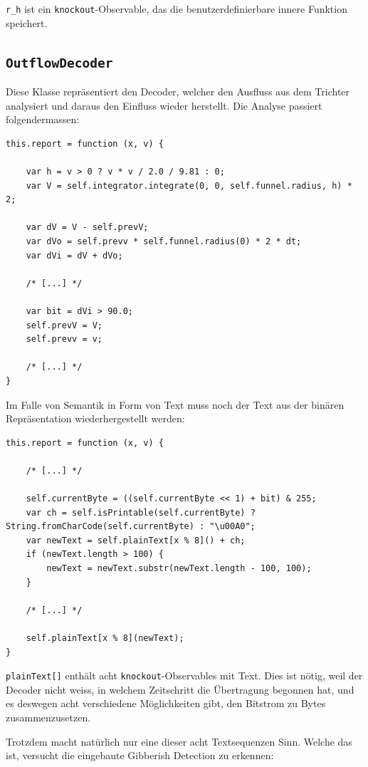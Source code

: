 \documentclass[11pt]{scrreprt} %
\theoremstyle{definition}
\begin{document}
{\tt r\_h} ist ein {\tt knockout}-Observable, das die benutzerdefinierbare innere Funktion speichert.

\subsection{{\tt OutflowDecoder}}

Diese Klasse repräsentiert den Decoder, welcher den Ausfluss aus dem Trichter analysiert und daraus den Einfluss wieder herstellt. Die Analyse passiert folgendermassen:

\begin{lstlisting}
this.report = function (x, v) {
	
	var h = v > 0 ? v * v / 2.0 / 9.81 : 0;
	var V = self.integrator.integrate(0, 0, self.funnel.radius, h) * 2;

	var dV = V - self.prevV;
	var dVo = self.prevv * self.funnel.radius(0) * 2 * dt;
	var dVi = dV + dVo;
		
	/* [...] */
		
	var bit = dVi > 90.0;
	self.prevV = V;
	self.prevv = v;

	/* [...] */
}
\end{lstlisting}

Im Falle von Semantik in Form von Text muss noch der Text aus der binären Repräsentation wiederhergestellt werden:

\begin{lstlisting}
this.report = function (x, v) {
	
	/* [...] */

	self.currentByte = ((self.currentByte << 1) + bit) & 255;
	var ch = self.isPrintable(self.currentByte) ? String.fromCharCode(self.currentByte) : "\u00A0";
	var newText = self.plainText[x % 8]() + ch;
	if (newText.length > 100) {
		newText = newText.substr(newText.length - 100, 100);
	}

	/* [...] */

	self.plainText[x % 8](newText);
}
\end{lstlisting}

{\tt plainText[]} enthält acht {\tt knockout}-Observables mit Text. Dies ist nötig, weil der Decoder nicht weiss, in welchem Zeitschritt die Übertragung begonnen hat, und es deswegen acht verschiedene Möglichkeiten gibt, den Bitstrom zu Bytes zusammenzusetzen.

Trotzdem macht natürlich nur eine dieser acht Textsequenzen Sinn. Welche das ist, versucht die eingebaute Gibberish Detection zu erkennen:
\end{document}
